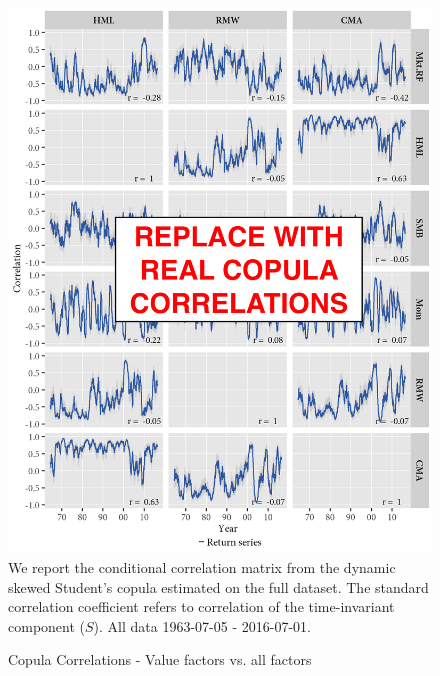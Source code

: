 \begin{figure}[H]
  \caption{Copula Correlations - Value factors vs. all factors}
  \label{diag:rolling_copula}
  \centering
  \begin{minipage}{\textwidth}
  \includegraphics[scale=1]{graphics/rolling_copula_ghskt.png}  
  \vspace{3mm}
  \footnotesize
  We report the conditional correlation matrix from the dynamic skewed Student's copula estimated on the full dataset. The standard correlation coefficient refers to correlation of the time-invariant component ($S$). All data 1963-07-05 - 2016-07-01.
  \end{minipage}
\end{figure}

